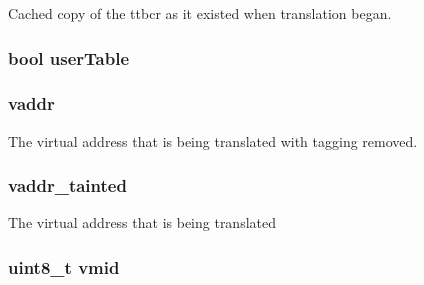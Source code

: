 \label{classArmISA_1_1TableWalker_1_1WalkerState_ad6762be565087b4bfb87f5bcb42673e7}
Cached copy of the ttbcr as it existed when translation began. \hypertarget{classArmISA_1_1TableWalker_1_1WalkerState_ab4be9ffb2fe22576e2f587374fdd20e6}{
\subsubsection[{userTable}]{\setlength{\rightskip}{0pt plus 5cm}bool {\bf userTable}}}
\label{classArmISA_1_1TableWalker_1_1WalkerState_ab4be9ffb2fe22576e2f587374fdd20e6}
\hypertarget{classArmISA_1_1TableWalker_1_1WalkerState_a9f933b300ef63eea367ca82f8da31025}{
\subsubsection[{vaddr}]{ {\bf vaddr}}}
\label{classArmISA_1_1TableWalker_1_1WalkerState_a9f933b300ef63eea367ca82f8da31025}
The virtual address that is being translated with tagging removed. \hypertarget{classArmISA_1_1TableWalker_1_1WalkerState_a1ebff4da206a1799d70b4ec129c33c5a}{
\subsubsection[{vaddr\_\-tainted}]{ {\bf vaddr\_\-tainted}}}
\label{classArmISA_1_1TableWalker_1_1WalkerState_a1ebff4da206a1799d70b4ec129c33c5a}
The virtual address that is being translated \hypertarget{classArmISA_1_1TableWalker_1_1WalkerState_add293169f7f2ac526b3fa14f950cf0bb}{
\subsubsection[{vmid}]{\setlength{\rightskip}{0pt plus 5cm}uint8\_\-t {\bf vmid}}}
